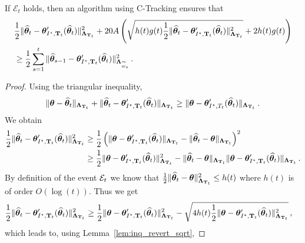 \begin{lemma}\label{lem:nc_proof_to_online_formulation}
If $\mathcal E_t$ holds, then an algorithm using C-Tracking ensures that
\begin{align*}
    &\frac{1}{2}\Vert \widehat{{\boldsymbol \theta}}_t - {\boldsymbol \theta}'_{I^\star,{\bf T}_t}(\widehat{{\boldsymbol \theta}}_t) \Vert_{{\boldsymbol \Lambda}_{{\bf T}_t}}^2 + 20 A\left(\sqrt{h(t)g(t) \frac{1}{2}\Vert \widehat{{\boldsymbol \theta}}_t - {\boldsymbol \theta}'_{I^\star,{\bf T}_t}(\widehat{{\boldsymbol \theta}}_t) \Vert_{{\boldsymbol \Lambda}_{{\bf T}_t}}^2}+ 2h(t)g(t)\right)\\
    &\geq \frac{1}{2}\sum_{s=1}^t \Vert \widehat{{\boldsymbol \theta}}_{s-1} - {\boldsymbol \theta}'_{I^\star,{\bf T}_t}(\widehat{{\boldsymbol \theta}}_t)\Vert_{{\boldsymbol \Lambda}_{\widetilde{w}_s}}^2\,.
\end{align*}
\end{lemma}
\begin{proof}

Using the triangular inequality,
\begin{align*}
\Vert {\boldsymbol \theta} - \widehat{{\boldsymbol \theta}}_t \Vert_{{\boldsymbol \Lambda}_{{\bf T}_t}} + \Vert \widehat{{\boldsymbol \theta}}_t - {\boldsymbol \theta}'_{I^\star,{\bf T}_t}(\widehat{{\boldsymbol \theta}}_t) \Vert_{{\boldsymbol \Lambda}_{{\bf T}_t}}
\ge \Vert {\boldsymbol \theta} - {\boldsymbol \theta}'_{I^\star,T_t}(\widehat{{\boldsymbol \theta}}_t) \Vert_{{\boldsymbol \Lambda}_{{\bf T}_t}}
\: .
\end{align*}
We obtain
\begin{align*}
\frac{1}{2}\Vert \widehat{{\boldsymbol \theta}}_t - {\boldsymbol \theta}'_{I^\star,{\bf T}_t}(\widehat{{\boldsymbol \theta}}_t) \Vert_{{\boldsymbol \Lambda}_{{\bf T}_t}}^2
&\ge \frac{1}{2} \left(\Vert {\boldsymbol \theta} - {\boldsymbol \theta}'_{I^\star,{\bf T}_t}(\widehat{{\boldsymbol \theta}}_t) \Vert_{{\boldsymbol \Lambda}_{{\bf T}_t}} -\Vert \widehat{{\boldsymbol \theta}}_t -{\boldsymbol \theta} \Vert_{{\boldsymbol \Lambda}_{{\bf T}_t}} \right)^2
\\
&\ge \frac{1}{2}\Vert {\boldsymbol \theta} - {\boldsymbol \theta}'_{I^\star,{\bf T}_t}(\widehat{{\boldsymbol \theta}}_t) \Vert_{{\boldsymbol \Lambda}_{{\bf T}_t}}^2
	-  \Vert \widehat{{\boldsymbol \theta}}_t -{\boldsymbol \theta} \Vert_{{\boldsymbol \Lambda}_{{\bf T}_t}} \Vert {\boldsymbol \theta} - {\boldsymbol \theta}'_{I^\star,{\bf T}_t}(\widehat{{\boldsymbol \theta}}_t) \Vert_{{\boldsymbol \Lambda}_{{\bf T}_t}}
\,.
\end{align*}
By definition of the event $\mathcal{E}_t$ we know that $\frac{1}{2}\Vert \widehat{{\boldsymbol \theta}}_t -{\boldsymbol \theta} \Vert_{{\boldsymbol \Lambda}_{{\bf T}_t}}^2 \leq h(t)$ where $h(t)$ is of order $O(\log(t))$. Thus we get
\begin{align*}
\frac{1}{2}\Vert \widehat{{\boldsymbol \theta}}_t - {\boldsymbol \theta}'_{I^\star,{\bf T}_t}(\widehat{{\boldsymbol \theta}}_t) \Vert_{{\boldsymbol \Lambda}_{{\bf T}_t}}^2 &\ge \frac{1}{2} \Vert {\boldsymbol \theta} - {\boldsymbol \theta}'_{I^\star,{\bf T}_t}(\widehat{{\boldsymbol \theta}}_t) \Vert_{{\boldsymbol \Lambda}_{{\bf T}_t}}^2 - \sqrt{4 h(t) \frac{1}{2}\Vert {\boldsymbol \theta} - {\boldsymbol \theta}'_{I^\star,{\bf T}_t}(\widehat{{\boldsymbol \theta}}_t) \Vert_{{\boldsymbol \Lambda}_{{\bf T}_t}}^2}\,,
\end{align*}
which leads to, using Lemma~\ref{lem:inq_revert_sqrt},

\end{proof}
